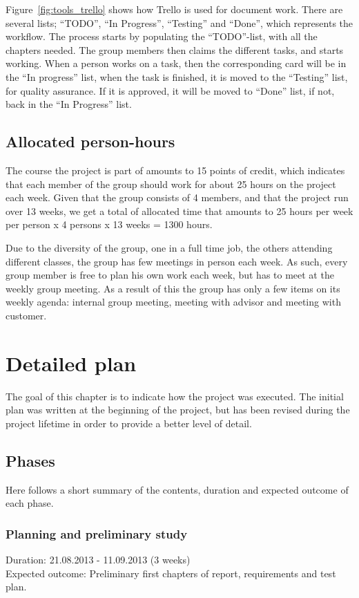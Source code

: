 \documentclass[11pt]{book}
\begin{document}
Figure~\ref{fig:tools_trello} shows how Trello is used for document work. There are several lists; ``TODO'', ``In Progress'', ``Testing'' and ``Done'', which represents the workflow. The process starts by populating the ``TODO''-list, with all the chapters needed. The group members then claims the different tasks, and starts working. When a person works on a task, then the corresponding card will be in the ``In progress'' list, when the task is finished, it is moved to the ``Testing'' list, for quality assurance. If it is approved, it will be moved to ``Done'' list, if not, back in the ``In Progress'' list.

\subsection{Allocated person-hours}
The course the project is part of amounts to 15 points of credit, which indicates that each member of the group should work for about 25 hours on the project each week. Given that the group consists of 4 members, and that the project run over 13 weeks, we get a total of allocated time that amounts to 25 hours per week per person x 4 persons x 13 weeks = 1300 hours.

Due to the diversity of the group, one in a full time job, the others attending different classes, the group has few meetings in person each week. As such, every group member is free to plan his own work each week, but has to meet at the weekly group meeting. As a result of this the group has only a few items on its weekly agenda: internal group meeting, meeting with advisor and meeting with customer.

\section{Detailed plan}
The goal of this chapter is to indicate how the project was executed. The initial plan was written at the beginning of the project, but has been revised during the project lifetime in order to provide a better level of detail.

\subsection{Phases}\label{subsec:phases}
Here follows a short summary of the contents, duration and expected outcome of each phase.

\subsubsection{Planning and preliminary study}
Duration: 21.08.2013 - 11.09.2013 (3 weeks)\\
Expected outcome: Preliminary first chapters of report, requirements and test plan.
\end{document}
